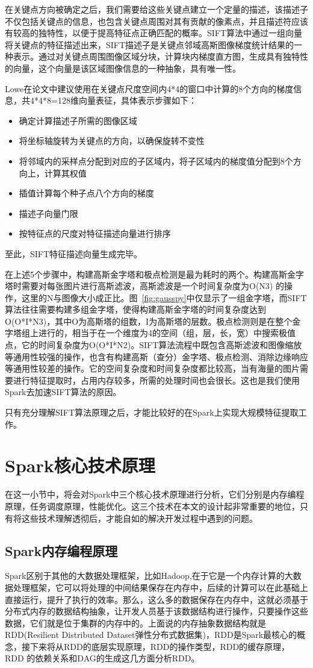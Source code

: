 在关键点方向被确定之后，我们需要给这些关键点建立一个定量的描述，该描述子不仅包括关键点的信息，也包含关键点周围对其有贡献的像素点，并且描述符应该有较高的独特性，以便于提高特征点正确匹配的概率。SIFT算法中通过一组向量将关键点的特征描述出来，SIFT描述子是关键点邻域高斯图像梯度统计结果的一种表示。通过对关键点周围图像区域分块，计算块内梯度直方图，生成具有独特性的向量，这个向量是该区域图像信息的一种抽象，具有唯一性。

Lowe在论文中建议使用在关键点尺度空间内4*4的窗口中计算的8个方向的梯度信息，共4*4*8=128维向量表征，具体表示步骤如下：
\begin{itemize}
\item 确定计算描述子所需的图像区域
\item 将坐标轴旋转为关键点的方向，以确保旋转不变性
\item 将邻域内的采样点分配到对应的子区域内，将子区域内的梯度值分配到8个方向上，计算其权值
\item 插值计算每个种子点八个方向的梯度
\item 描述子向量门限
\item 按特征点的尺度对特征描述向量进行排序
\end{itemize}

至此，SIFT特征描述向量生成完毕。

在上述5个步骤中，构建高斯金字塔和极点检测是最为耗时的两个。构建高斯金字塔时需要对每张图片进行高斯滤波，高斯滤波是一个时间复杂度为O(N3) 的操作，这里的N与图像大小成正比。图~\ref{fig:gausspy}中仅显示了一组金字塔，而SIFT算法往往需要构建多组金字塔，使得构建高斯金字塔的时间复杂度达到O(O*I*N3)，其中O为高斯塔的组数，I为高斯塔的层数。极点检测则是在整个金字塔组上进行的，相当于在一个维度为4的空间（组，层，长，宽）中搜索极值点，它的时间复杂度为O(O*I*N2)。SIFT算法流程中既包含高斯滤波和图像缩放等通用性较强的操作，也含有构建高斯（查分）金字塔、极点检测、消除边缘响应等通用性较差的操作。它的空间复杂度和时间复杂度都比较高，当有海量的图片需要进行特征提取时，占用内存较多，所需的处理时间也会很长。这也是我们使用Spark去加速SIFT算法的原因。

只有充分理解SIFT算法原理之后，才能比较好的在Spark上实现大规模特征提取工作。

\section{Spark核心技术原理}
在这一小节中，将会对Spark中三个核心技术原理进行分析，它们分别是内存编程原理，任务调度原理，性能优化。这三个技术在本文的设计起非常重要的地位，只有将这些技术理解透彻后，才能自如的解决开发过程中遇到的问题。
\subsection{Spark内存编程原理}
Spark区别于其他的大数据处理框架，比如Hadoop,在于它是一个内存计算的大数据处理框架，它可以将处理的中间结果保存在内存中，后续的计算可以在此基础上直接运行，提升了执行的效率。那么，这么多的数据保存在内存中，这就必须基于分布式内存的数据结构抽象，让开发人员基于该数据结构进行操作，只要操作这些数据，它们就是位于集群的内存中的。上面说的内存抽象数据结构就是RDD(Resilient Distributed Dataset弹性分布式数据集)，RDD是Spark最核心的概念，接下来将从RDD的底层实现原理，RDD的操作类型，RDD的缓存原理，RDD 的依赖关系和DAG的生成这几方面分析RDD。
